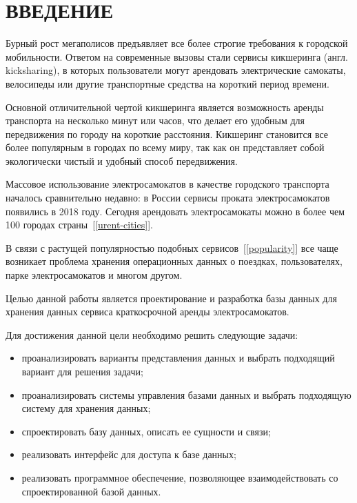 \chapter*{ВВЕДЕНИЕ}

Бурный рост мегаполисов предъявляет все более строгие требования к городской мобильности. Ответом на современные вызовы стали сервисы кикшеринга (англ. kicksharing), в которых пользователи могут арендовать электрические самокаты, велосипеды или другие транспортные средства на короткий период времени.

Основной отличительной чертой кикшеринга является возможность аренды транспорта на несколько минут или часов, что делает его удобным для передвижения по городу на короткие расстояния. Кикшеринг становится все более популярным в городах по всему миру, так как он представляет собой экологически чистый и удобный способ передвижения.

Массовое использование электросамокатов в качестве городского транспорта началось сравнительно недавно: в России сервисы проката электросамокатов появились в 2018 году. Сегодня арендовать электросамокаты можно в более чем 100 городах страны~[\ref{urent-cities}].

В связи с растущей популярностью подобных сервисов~[\ref{popularity}] все чаще возникает проблема хранения операционных данных о поездках, пользователях, парке электросамокатов и многом другом.

Целью данной работы является проектирование и разработка базы данных для хранения данных сервиса краткосрочной аренды электросамокатов.

Для достижения данной цели необходимо решить следующие задачи:

\begin{itemize}
	\item проанализировать варианты представления данных и выбрать подходящий вариант для решения задачи;
	\item проанализировать системы управления базами данных и выбрать подходящую систему для хранения данных;
	\item спроектировать базу данных, описать ее сущности и связи;
	\item реализовать интерфейс для доступа к базе данных;
	\item реализовать программное обеспечение, позволяющее взаимодействовать со спроектированной базой данных.
\end{itemize}